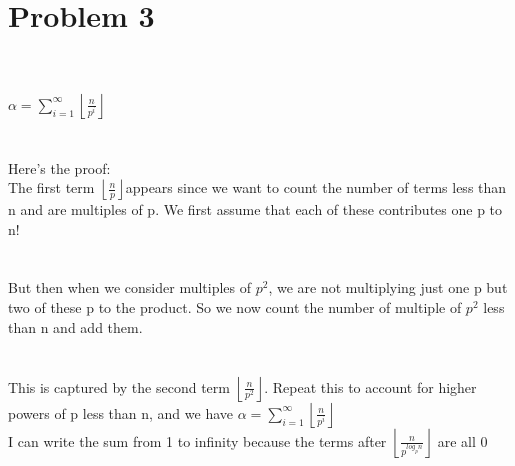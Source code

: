 \documentclass{article}
\begin{document}
\section{Problem 3}
\\ \hspace*{\fill} \\
\large$\alpha = \sum_{i=1}^{\infty} \left\lfloor\frac{n}{p^i}\right\rfloor$\\
\\ \hspace*{\fill} \\
\normalsize
Here's the proof:\\
The first term $ \left\lfloor\frac{n}{p}\right\rfloor$appears since we want to count the number of terms less than n and are multiples of p. We first assume that each of these contributes one p to n!\\
\\ \hspace*{\fill} \\
But then when we consider multiples of $p^2$, we are not multiplying just one p but two of these p to the product. So we now count the number of multiple of $p^2$ less than n and add them.\\
\\ \hspace*{\fill} \\
This is captured by the second term $\left\lfloor\frac{n}{p^2}\right\rfloor$. Repeat this to account for higher powers of p less than n, and we have $\alpha = \sum_{i=1}^{\infty} \left\lfloor\frac{n}{p^i}\right\rfloor$\\
I can write the sum from 1 to infinity because the terms after $\left\lfloor\frac{n}{p^{log_pn}}\right\rfloor$ are all 0\\
\\ \hspace*{\fill} \\
\end{document}
